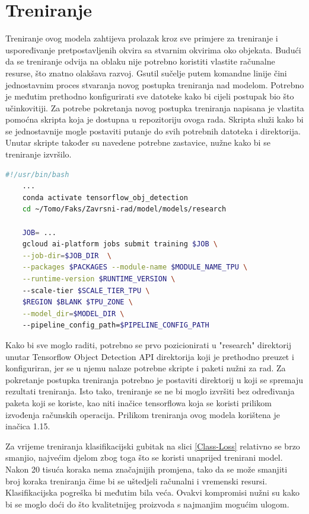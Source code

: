 \section{Treniranje}
Treniranje ovog modela zahtijeva prolazak kroz sve primjere za treniranje i uspoređivanje pretpostavljenih okvira sa stvarnim okvirima oko objekata. Budući da se treniranje odvija na oblaku 
nije potrebno koristiti vlastite računalne resurse, što znatno olakšava razvoj. Gsutil sučelje putem komandne linije čini jednostavnim proces stvaranja novog postupka treniranja nad modelom.
Potrebno je međutim prethodno konfigurirati sve datoteke kako bi cijeli postupak bio što učinkovitiji. Za potrebe pokretanja novog postupka treniranja napisana je vlastita
pomoćna skripta koja je dostupna u repozitoriju ovoga rada. Skripta služi kako bi se jednostavnije mogle postaviti putanje do svih potrebnih datoteka i direktorija. Unutar
skripte također su navedene potrebne zastavice, nužne kako bi se treniranje izvršilo. 

\begin{lstlisting}[language=bash, tabsize=2]
    #!/usr/bin/bash
    ...
    conda activate tensorflow_obj_detection
    cd ~/Tomo/Faks/Zavrsni-rad/model/models/research
    
    JOB= ...
    gcloud ai-platform jobs submit training $JOB \
    --job-dir=$JOB_DIR  \
    --packages $PACKAGES --module-name $MODULE_NAME_TPU \
    --runtime-version $RUNTIME_VERSION \ 
    --scale-tier $SCALE_TIER_TPU \
    $REGION $BLANK $TPU_ZONE \
    --model_dir=$MODEL_DIR \ 
    --pipeline_config_path=$PIPELINE_CONFIG_PATH
\end{lstlisting}
Kako bi sve moglo raditi, potrebno se prvo pozicionirati u "research" direktorij unutar Tensorflow Object Detection API direktorija koji je prethodno preuzet i konfiguriran, jer se u njemu nalaze potrebne skripte i paketi nužni za 
rad. Za pokretanje postupka treniranja potrebno je postaviti direktorij u koji se spremaju rezultati treniranja. \newline Isto tako, treniranje se ne bi moglo izvršiti 
bez određivanja paketa koji se koriste, kao niti inačice tensorflowa koja se koristi prilikom izvođenja računskih operacija. Prilikom treniranja ovog modela korištena je inačica 1.15.

Za vrijeme treniranja klasifikacijski gubitak na slici \ref{Class-Loss} relativno se brzo smanjio, najvećim djelom zbog toga što se koristi unaprijed trenirani model. Nakon 20 tisuća koraka
nema značajnijih promjena, tako da se može smanjiti broj koraka treniranja čime bi se uštedjeli računalni i vremenski resursi. Klasifikacijska pogreška bi međutim bila veća. Ovakvi kompromisi nužni su kako bi se moglo doći do što kvalitetnijeg proizvoda s najmanjim mogućim ulogom.

